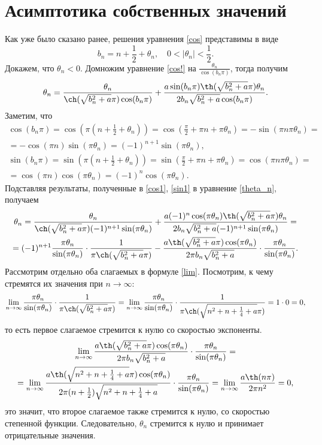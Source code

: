 \documentclass[12pt, a4paper]{article}
\begin{document}
\section{Асимптотика собственных значений}

Как уже было сказано ранее, решения уравнения \eqref{cos} представимы в виде 
\[
b_n=n+\frac12+\theta_n, \quad 0<|\theta_n|<\frac12.
\]
Докажем, что $\theta_n<0$.
Домножим уравнение \eqref{cos!} на $\frac{\theta_n}{\cos(b_n\pi)}$, тогда получим
\begin{equation}
\theta_n = \frac{\theta_n}{\ch(\sqrt{b_n^2+a}\pi)\cos(b_n\pi)} + \frac{a\sin(b_n\pi)\th(\sqrt{b_n^2+a}\pi)\theta_n}{2b_n\sqrt{b_n^2+a}\cos(b_n\pi)}. \label{theta_n}
\end{equation}
Заметим, что
\begin{multline}
\cos(b_n\pi) = \cos(\pi(n+\frac12+\theta_n)) = \cos(\frac{\pi}{2}+\pi n + \pi\theta_n) = -\sin(\pi n \pi\theta_n) = \\ = -\cos(\pi n)\sin(\pi\theta_n) = (-1)^{n+1}\sin(\pi\theta_n), \label{cos1}
\end{multline}
\begin{multline}
\sin(b_n\pi) = \sin(\pi(n+\frac12+\theta_n)) = \sin(\frac{\pi}{2}+\pi n + \pi\theta_n) = \cos(\pi n \pi\theta_n) = \\ = \cos(\pi n)\cos(\pi\theta_n) = (-1)^{n}\cos(\pi\theta_n). \label{sin1}
\end{multline}
Подставляя результаты, полученные в \eqref{cos1}, \eqref{sin1} в уравнение \eqref{theta_n}, получаем
\begin{multline}
\theta_n = \frac{\theta_n}{\ch(\sqrt{b_n^2+a}\pi)(-1)^{n+1}\sin(\pi\theta_n)} + \frac{a(-1)^{n}\cos(\pi\theta_n)\th(\sqrt{b_n^2+a}\pi)\theta_n}{2b_n\sqrt{b_n^2+a} (-1)^{n+1} \sin(\pi\theta_n)} = \\ =
(-1)^{n+1}\frac{\pi\theta_n}{\sin(\pi\theta_n)}\cdot\frac{1}{\pi\ch(\sqrt{b_n^2+a}\pi)} - \frac{a\th(\sqrt{b_n^2+a}\pi)\cos(\pi\theta_n)}{2\pi b_n\sqrt{b_n^2+a}}\cdot\frac{\pi\theta_n}{\sin(\pi\theta_n)}. \label{lim}
\end{multline}
Рассмотрим отдельно оба слагаемых в формуле \eqref{lim}. Посмотрим, к чему стремятся их значения при $n\rightarrow\infty$:
\[
\lim\limits_{n\rightarrow\infty}  \frac{\pi\theta_n}{\sin(\pi\theta_n)}\cdot\frac{1}{\pi\ch(\sqrt{b_n^2+a}\pi)} = \lim\limits_{n\rightarrow\infty} \frac{\pi\theta_n}{\sin(\pi\theta_n)}\cdot\frac{1}{\pi\ch(\sqrt{n^2+n+\frac14+a}\pi)} = 1\cdot 0  = 0,
\]
то есть первое слагаемое стремится к нулю со скоростью экспоненты.
\begin{multline*}
\lim\limits_{n\rightarrow\infty} \frac{a\th(\sqrt{b_n^2+a}\pi)\cos(\pi\theta_n)}{2\pi b_n\sqrt{b_n^2+a}}\cdot\frac{\pi\theta_n}{\sin(\pi\theta_n)} = \\ = \lim\limits_{n\rightarrow\infty} \frac{a\th(\sqrt{n^2+n+\frac14+a}\pi)\cos(\pi\theta_n)}{2\pi (n+\frac12)\sqrt{n^2+n+\frac14+a}}\cdot\frac{\pi\theta_n}{\sin(\pi\theta_n)} = \lim\limits_{n\rightarrow\infty} \frac{a\th(n\pi)}{2\pi n^2} = 0,
\end{multline*}
это значит, что второе слагаемое также стремится к нулю, со скоростью степенной функции. Следовательно, $\theta_n$ стремится к нулю и принимает отрицательные значения.
\end{document}
